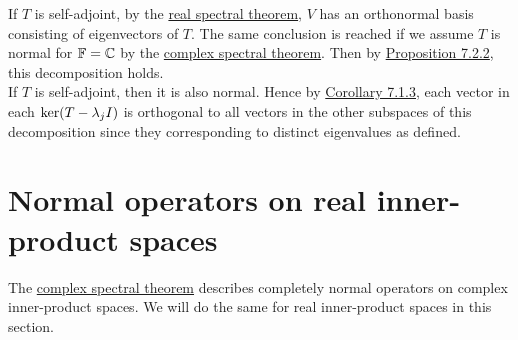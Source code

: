 \documentclass{report}
\begin{document}
	\begin{myproof}
		If $T$ is self-adjoint, by the \hyperref[sec:Thm6]{real spectral theorem}, $V$ has an orthonormal basis consisting of eigenvectors of $T$. The same conclusion is reached if we assume $T$ is normal for $\FF=\CC$ by the \hyperref[sec:Thm5]{complex spectral theorem}. Then by \hyperref[sec:Prop5]{Proposition 7.2.2}, this decomposition holds. \\
		
		If $T$ is self-adjoint, then it is also normal. Hence by \hyperref[sec:Cor3]{Corollary 7.1.3}, each vector in each $\ker(T-\lambda_jI)$ is orthogonal to all vectors in the other subspaces of this decomposition since they corresponding to distinct eigenvalues as defined.
	\end{myproof}
	
	\section{Normal operators on real inner-product spaces}
	The \hyperref[sec:Thm5]{complex spectral theorem} describes completely normal operators on complex inner-product spaces. We will do the same for real inner-product spaces in this section.
	
\end{document}
